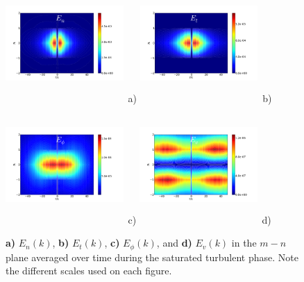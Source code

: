 \documentclass[showpacs,preprintnumbers,amsmath,amssymb,superscriptaddress]{revtex4}
\begin{document}
\begin{figure}
\includegraphics[width=0.40\textwidth,height=45mm]{En}~a)
\hfil
\includegraphics[width=0.40\textwidth,height=45mm]{Et}~b)
\hfil
\includegraphics[width=0.40\textwidth,height=45mm]{Ep}~c)
\hfil
\includegraphics[width=0.40\textwidth,height=45mm]{Ev}~d)
\hfil
\caption{\textbf{a)} $E_n(k)$, \textbf{b)} $E_t(k)$, \textbf{c)} $E_\phi(k)$, and \textbf{d)} $E_v(k)$ in the $m-n$ plane averaged over time during the saturated turbulent phase.
Note the different scales used on each figure.}
\label{energy_figures}
\end{figure}
\end{document}
